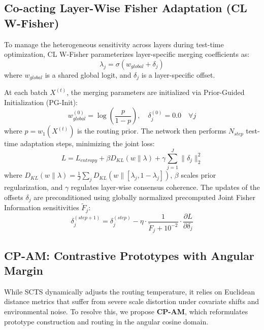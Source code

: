 \documentclass{article}
\theoremstyle{plain}
\theoremstyle{definition}
\theoremstyle{remark}
\begin{document}
\subsection{Co-acting Layer-Wise Fisher Adaptation (CL W-Fisher)}
To manage the heterogeneous sensitivity across layers during test-time optimization, CL W-Fisher parameterizes layer-specific merging coefficients as:
\begin{equation}
\lambda_j = \sigma(w_{global} + \delta_j)
\end{equation}
where $w_{global}$ is a shared global logit, and $\delta_j$ is a layer-specific offset.

At each batch $X^{(t)}$, the merging parameters are initialized via Prior-Guided Initialization (PG-Init):
\begin{equation}
w_{global}^{(0)} = \log\left(\frac{p}{1-p}\right), \quad \delta_j^{(0)} = 0.0 \quad \forall j
\end{equation}
where $p = w_1(X^{(t)})$ is the routing prior.
The network then performs $N_{step}$ test-time adaptation steps, minimizing the joint loss:
\begin{equation}
L = L_{entropy} + \beta D_{KL}(w \parallel \lambda) + \gamma \sum_{j=1}^J \|\delta_j\|_2^2
\end{equation}
where $D_{KL}(w \parallel \lambda) = \frac{1}{J} \sum_{j} D_{KL}(w \parallel [\lambda_j, 1-\lambda_j])$, $\beta$ scales prior regularization, and $\gamma$ regulates layer-wise consensus coherence. The updates of the offsets $\delta_j$ are preconditioned using globally normalized precomputed Joint Fisher Information sensitivities $\tilde{F}_j$:
\begin{equation}
\delta_j^{(step+1)} = \delta_j^{(step)} - \eta \cdot \frac{1}{\tilde{F}_j + 10^{-2}} \cdot \frac{\partial L}{\partial \delta_j}
\end{equation}

\subsection{CP-AM: Contrastive Prototypes with Angular Margin}
While SCTS dynamically adjusts the routing temperature, it relies on Euclidean distance metrics that suffer from severe scale distortion under covariate shifts and environmental noise. To resolve this, we propose \textbf{CP-AM}, which reformulates prototype construction and routing in the angular cosine domain.
\end{document}
